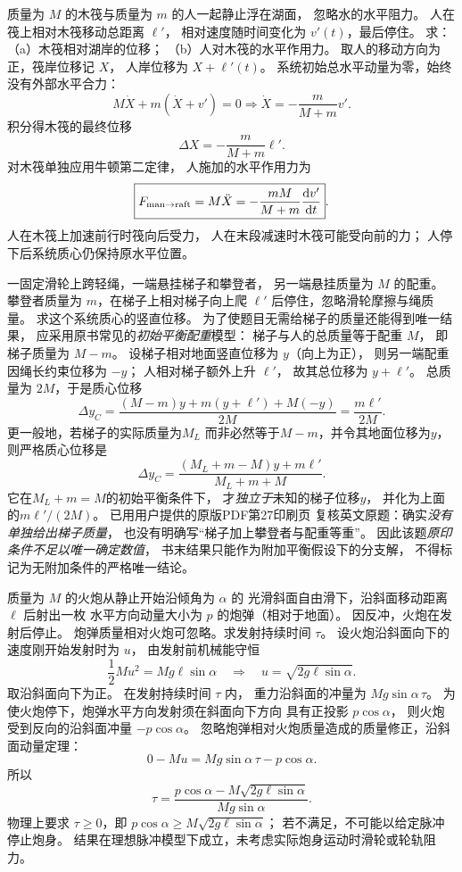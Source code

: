 质量为 $M$ 的木筏与质量为 $m$ 的人一起静止浮在湖面，
忽略水的水平阻力。
人在筏上相对木筏移动总距离 $\ell'$，
相对速度随时间变化为 $v'(t)$，最后停住。
求：（a）木筏相对湖岸的位移；
（b）人对木筏的水平作用力。
\exsolution
取人的移动方向为正，筏岸位移记 $X$，
人岸位移为 $X+\ell'(t)$。
系统初始总水平动量为零，始终没有外部水平合力：
\[
M\dot X+m(\dot X+v')=0
\Longrightarrow
\dot X=-\frac{m}{M+m}v'.
\]
积分得木筏的最终位移
\[
\boxed{\Delta X=-\frac{m}{M+m}\ell'}.
\]
对木筏单独应用牛顿第二定律，
人施加的水平作用力为
\[
\boxed{F_{\rm man\to raft}=M\ddot X
=-\frac{mM}{M+m}\frac{\mathrm dv'}{\mathrm dt}}.
\]
\excheck 人在木筏上加速前行时筏向后受力，
人在末段减速时木筏可能受向前的力；
人停下后系统质心仍保持原水平位置。

一固定滑轮上跨轻绳，一端悬挂梯子和攀登者，
另一端悬挂质量为 $M$ 的配重。
攀登者质量为 $m$，在梯子上相对梯子向上爬
$\ell'$ 后停住，忽略滑轮摩擦与绳质量。
求这个系统质心的竖直位移。
\exsolution
为了使题目无需给梯子的质量还能得到唯一结果，
应采用原书常见的\emph{初始平衡配重}模型：
梯子与人的总质量等于配重 $M$，
即梯子质量为 $M-m$。
设梯子相对地面竖直位移为 $y$（向上为正），
则另一端配重因绳长约束位移为 $-y$；
人相对梯子额外上升 $\ell'$，
故其总位移为 $y+\ell'$。
总质量为 $2M$，于是质心位移
\[
\Delta y_C=
\frac{(M-m)y+m(y+\ell')+M(-y)}{2M}
=\boxed{\frac{m\ell'}{2M}}.
\]
更一般地，若梯子的实际质量为$M_L$
而非必然等于$M-m$，并令其地面位移为$y$，
则严格质心位移是
\[
 \boxed{\Delta y_C=
 \frac{(M_L+m-M)y+m\ell'}{M_L+m+M}}.
\]
它在$M_L+m=M$的初始平衡条件下，
才\emph{独立于}未知的梯子位移$y$，
并化为上面的$m\ell'/(2M)$。
\excheck 已用用户提供的原版PDF第27印刷页
复核英文原题：确实\emph{没有单独给出梯子质量}，
也没有明确写“梯子加上攀登者与配重等重”。
因此该题\emph{原印条件不足以唯一确定数值}，
书末结果只能作为附加平衡假设下的分支解，
不得标记为无附加条件的严格唯一结论。

质量为 $M$ 的火炮从静止开始沿倾角为 $\alpha$ 的
光滑斜面自由滑下，沿斜面移动距离 $\ell$ 后射出一枚
水平方向动量大小为 $p$ 的炮弹（相对于地面）。
因反冲，火炮在发射后停止。
炮弹质量相对火炮可忽略。求发射持续时间 $\tau$。
\exsolution
设火炮沿斜面向下的速度刚开始发射时为 $u$，
由发射前机械能守恒
\[
\frac12Mu^2=Mg\ell\sin\alpha
\quad\Longrightarrow\quad
u=\sqrt{2g\ell\sin\alpha}.
\]
取沿斜面向下为正。
在发射持续时间 $\tau$ 内，
重力沿斜面的冲量为 $Mg\sin\alpha\,\tau$。
为使火炮停下，炮弹水平方向发射须在斜面向下方向
具有正投影 $p\cos\alpha$，
则火炮受到反向的沿斜面冲量 $-p\cos\alpha$。
忽略炮弹相对火炮质量造成的质量修正，沿斜面动量定理：
\[
0-Mu=Mg\sin\alpha\,\tau-p\cos\alpha .
\]
所以
\[
\boxed{\tau=
\frac{p\cos\alpha-M\sqrt{2g\ell\sin\alpha}}
 {Mg\sin\alpha}}.
\]
\excheck 物理上要求 $\tau\ge0$，即
$p\cos\alpha\ge M\sqrt{2g\ell\sin\alpha}$；
若不满足，不可能以给定脉冲停止炮身。
结果在理想脉冲模型下成立，未考虑实际炮身运动时滑轮或轮轨阻力。

